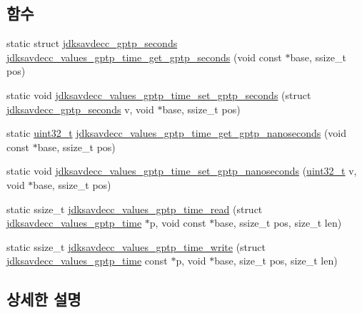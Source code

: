 \subsection*{함수}
\begin{DoxyCompactItemize}
\item 
static struct \hyperlink{structjdksavdecc__gptp__seconds}{jdksavdecc\+\_\+gptp\+\_\+seconds} \hyperlink{group__values__gptp__time_ga49bdb84c4dea31f69f583ed725152a22}{jdksavdecc\+\_\+values\+\_\+gptp\+\_\+time\+\_\+get\+\_\+gptp\+\_\+seconds} (void const $\ast$base, ssize\+\_\+t pos)
\item 
static void \hyperlink{group__values__gptp__time_gabc65d638aef883cf8a750ab71f0fb955}{jdksavdecc\+\_\+values\+\_\+gptp\+\_\+time\+\_\+set\+\_\+gptp\+\_\+seconds} (struct \hyperlink{structjdksavdecc__gptp__seconds}{jdksavdecc\+\_\+gptp\+\_\+seconds} v, void $\ast$base, ssize\+\_\+t pos)
\item 
static \hyperlink{parse_8c_a6eb1e68cc391dd753bc8ce896dbb8315}{uint32\+\_\+t} \hyperlink{group__values__gptp__time_ga125442481fda8ef931f1e6ae5b787839}{jdksavdecc\+\_\+values\+\_\+gptp\+\_\+time\+\_\+get\+\_\+gptp\+\_\+nanoseconds} (void const $\ast$base, ssize\+\_\+t pos)
\item 
static void \hyperlink{group__values__gptp__time_ga80754a9c52ece4c52f0dad6fb42d9040}{jdksavdecc\+\_\+values\+\_\+gptp\+\_\+time\+\_\+set\+\_\+gptp\+\_\+nanoseconds} (\hyperlink{parse_8c_a6eb1e68cc391dd753bc8ce896dbb8315}{uint32\+\_\+t} v, void $\ast$base, ssize\+\_\+t pos)
\item 
static ssize\+\_\+t \hyperlink{group__values__gptp__time_gac150692574fc07f1339db553770ce0a4}{jdksavdecc\+\_\+values\+\_\+gptp\+\_\+time\+\_\+read} (struct \hyperlink{structjdksavdecc__values__gptp__time}{jdksavdecc\+\_\+values\+\_\+gptp\+\_\+time} $\ast$p, void const $\ast$base, ssize\+\_\+t pos, size\+\_\+t len)
\item 
static ssize\+\_\+t \hyperlink{group__values__gptp__time_ga6111a486945e1650aecf9eb50ad7939d}{jdksavdecc\+\_\+values\+\_\+gptp\+\_\+time\+\_\+write} (struct \hyperlink{structjdksavdecc__values__gptp__time}{jdksavdecc\+\_\+values\+\_\+gptp\+\_\+time} const $\ast$p, void $\ast$base, size\+\_\+t pos, size\+\_\+t len)
\end{DoxyCompactItemize}


\subsection{상세한 설명}


